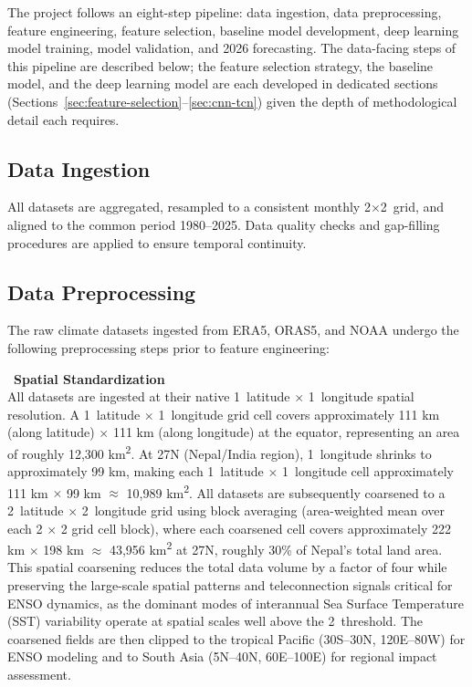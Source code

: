 The project follows an eight-step pipeline: data ingestion, data preprocessing, feature engineering, feature selection, baseline model development, deep learning model training, model validation, and 2026 forecasting. The data-facing steps of this pipeline are described below; the feature selection strategy, the baseline model, and the deep learning model are each developed in dedicated sections (Sections~\ref{sec:feature-selection}--\ref{sec:cnn-tcn}) given the depth of methodological detail each requires.

\subsection{Data Ingestion}
All datasets are aggregated, resampled to a consistent monthly 2\degree$\times$2\degree\ grid, and aligned to the common period 1980--2025. Data quality checks and gap-filling procedures are applied to ensure temporal continuity.

\subsection{Data Preprocessing}

The raw climate datasets ingested from ERA5, ORAS5, and NOAA undergo the following preprocessing steps prior to feature engineering:

\noindent\textbullet\ \textbf{Spatial Standardization}\\
All datasets are ingested at their native 1\degree\ latitude $\times$ 1\degree\ longitude spatial resolution. A 1\degree\ latitude $\times$ 1\degree\ longitude grid cell covers approximately 111 km (along latitude) $\times$ 111 km (along longitude) at the equator, representing an area of roughly 12,300 km\textsuperscript{2}. At 27\degree N (Nepal/India region), 1\degree\ longitude shrinks to approximately 99 km, making each 1\degree\ latitude $\times$ 1\degree\ longitude cell approximately 111 km $\times$ 99 km $\approx$ 10,989 km\textsuperscript{2}. All datasets are subsequently coarsened to a 2\degree\ latitude $\times$ 2\degree\ longitude grid using block averaging (area-weighted mean over each 2 $\times$ 2 grid cell block), where each coarsened cell covers approximately 222 km $\times$ 198 km $\approx$ 43,956 km\textsuperscript{2} at 27\degree N, roughly 30\% of Nepal's total land area. This spatial coarsening reduces the total data volume by a factor of four while preserving the large-scale spatial patterns and teleconnection signals critical for ENSO dynamics, as the dominant modes of interannual Sea Surface Temperature (SST) variability operate at spatial scales well above the 2\degree\ threshold. The coarsened fields are then clipped to the tropical Pacific (30\degree S--30\degree N, 120\degree E--80\degree W) for ENSO modeling and to South Asia (5\degree N--40\degree N, 60\degree E--100\degree E) for regional impact assessment.

